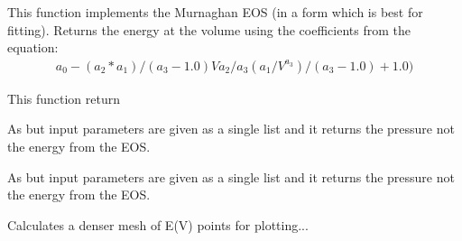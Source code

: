 \documentclass[letterpaper,10pt,english]{sphinxmanual}
\begin{document}

\begin{fulllineitems}
\label{pyqha:pyqha.eos.E_MurnV}
This function implements the Murnaghan EOS (in a form which is best for fitting).
Returns the energy at the volume  using the coefficients  
from the equation:
\begin{equation*}
\begin{split}a_0 - (a_2*a_1)/(a_3-1.0) V a_2/a_3 ( a_1/V^{a_3})/(a_3-1.0) +1.0 )\end{split}
\end{equation*}
\end{fulllineitems}


\begin{fulllineitems}
\label{pyqha:pyqha.eos.H_Murn}
This function return

As {\hyperref[pyqha:pyqha.eos.E_MurnV]{}} but input parameters are given as a single list 
 and it returns the pressure not the energy from the EOS.

\end{fulllineitems}


\begin{fulllineitems}
\label{pyqha:pyqha.eos.P_Murn}
As {\hyperref[pyqha:pyqha.eos.E_MurnV]{}} but input parameters are given as a single list 
 and it returns the pressure not the energy from the EOS.

\end{fulllineitems}


\begin{fulllineitems}
\label{pyqha:pyqha.eos.calculate_fitted_points}
Calculates a denser mesh of E(V) points for plotting...

\end{fulllineitems}
\end{document}
